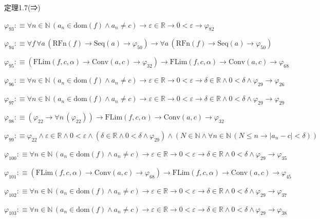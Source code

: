 \begin{fullproof}{定理1.7(⇒)}
\begin{abbrevlist}
\item $\varphi_{93} :\equiv \forall n \in \mathbb{N}\,(a_{n} \in \mathrm{dom}(f) \land a_{n} \neq c) \to \varepsilon \in \mathbb{R} \to 0 < \varepsilon \to \varphi_{82}$
\item $\varphi_{94} :\equiv \forall f\,\forall a\,(\mathrm{RFn}(f) \to \mathrm{Seq}(a) \to \varphi_{50}) \to \forall a\,(\mathrm{RFn}(f) \to \mathrm{Seq}(a) \to \varphi_{50})$
\item $\varphi_{95} :\equiv (\mathrm{FLim}(f,c,\alpha) \to \mathrm{Conv}(a,c) \to \varphi_{32}) \to \mathrm{FLim}(f,c,\alpha) \to \mathrm{Conv}(a,c) \to \varphi_{68}$
\item $\varphi_{96} :\equiv \forall n \in \mathbb{N}\,(a_{n} \in \mathrm{dom}(f) \land a_{n} \neq c) \to \varepsilon \in \mathbb{R} \to 0 < \varepsilon \to \delta \in \mathbb{R} \land 0 < \delta \land \varphi_{29} \to \varphi_{26}$
\item $\varphi_{97} :\equiv \forall n \in \mathbb{N}\,(a_{n} \in \mathrm{dom}(f) \land a_{n} \neq c) \to \varepsilon \in \mathbb{R} \to 0 < \varepsilon \to \delta \in \mathbb{R} \land 0 < \delta \land \varphi_{29} \to \varphi_{29}$
\item $\varphi_{98} :\equiv (\varphi_{22} \to \forall n\,(\varphi_{22})) \to \mathrm{FLim}(f,c,\alpha) \to \mathrm{Conv}(a,c) \to \varphi_{32}$
\item $\varphi_{99} :\equiv \varphi_{22} \land \varepsilon \in \mathbb{R} \land 0 < \varepsilon \land (\delta \in \mathbb{R} \land 0 < \delta \land \varphi_{29}) \land (N \in \mathbb{N} \land \forall n \in \mathbb{N}\,(N \leq n \to \lvert a_{n} - c \rvert < \delta))$
\item $\varphi_{100} :\equiv \forall n \in \mathbb{N}\,(a_{n} \in \mathrm{dom}(f) \land a_{n} \neq c) \to \varepsilon \in \mathbb{R} \to 0 < \varepsilon \to \delta \in \mathbb{R} \land 0 < \delta \land \varphi_{29} \to \varphi_{35}$
\item $\varphi_{101} :\equiv (\mathrm{FLim}(f,c,\alpha) \to \mathrm{Conv}(a,c) \to \varphi_{68}) \to \mathrm{FLim}(f,c,\alpha) \to \mathrm{Conv}(a,c) \to \varphi_{45}$
\item $\varphi_{102} :\equiv \forall n \in \mathbb{N}\,(a_{n} \in \mathrm{dom}(f) \land a_{n} \neq c) \to \varepsilon \in \mathbb{R} \to 0 < \varepsilon \to \delta \in \mathbb{R} \land 0 < \delta \land \varphi_{29} \to \varphi_{37}$
\item $\varphi_{103} :\equiv \forall n \in \mathbb{N}\,(a_{n} \in \mathrm{dom}(f) \land a_{n} \neq c) \to \varepsilon \in \mathbb{R} \to 0 < \varepsilon \to \delta \in \mathbb{R} \land 0 < \delta \land \varphi_{29} \to \varphi_{38}$

\end{abbrevlist}
\end{fullproof}
